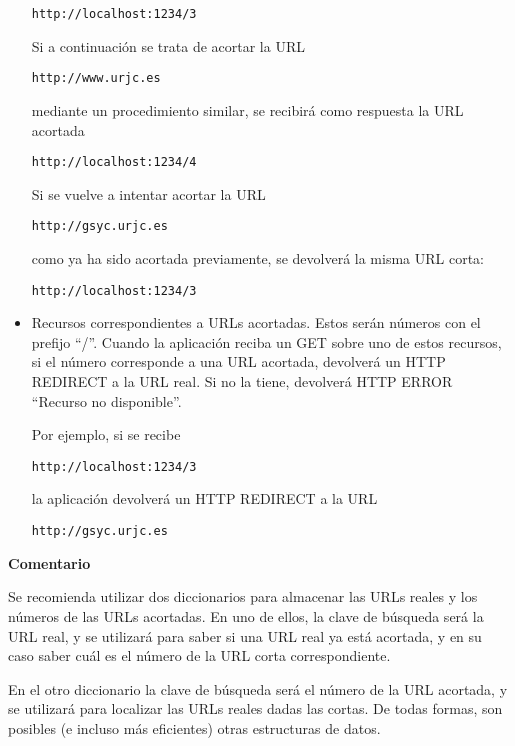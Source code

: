 \begin{itemize}
\verb|http://localhost:1234/3|

Si a continuación se trata de acortar la URL

\verb|http://www.urjc.es|

mediante un procedimiento similar, se recibirá como respuesta la URL acortada

\verb|http://localhost:1234/4|

Si se vuelve a intentar acortar la URL

\verb|http://gsyc.urjc.es|

como ya ha sido acortada previamente, se devolverá la misma URL corta:

\verb|http://localhost:1234/3|

\item Recursos correspondientes a URLs acortadas. Estos serán números con el prefijo ``/''. Cuando la aplicación reciba un GET sobre uno de estos recursos, si el número corresponde a una URL acortada, devolverá un HTTP REDIRECT a la URL real. Si no la tiene, devolverá HTTP ERROR ``Recurso no disponible''.

Por ejemplo, si se recibe 

\verb|http://localhost:1234/3|

la aplicación devolverá un HTTP REDIRECT a la URL

\verb|http://gsyc.urjc.es|

\end{itemize}


\textbf{Comentario}

Se recomienda utilizar dos diccionarios para almacenar las URLs reales y los números de las URLs acortadas. En uno de ellos, la clave de búsqueda será la URL real, y se utilizará para saber si una URL real ya está acortada, y en su caso saber cuál es el número de la URL corta correspondiente.

En el otro diccionario la clave de búsqueda será el número de la URL acortada, y se utilizará para localizar las URLs reales dadas las cortas. De todas formas, son posibles (e incluso más eficientes) otras estructuras de datos.

